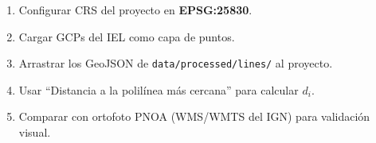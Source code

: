 \begin{enumerate}[leftmargin=1.5em]
  \item Configurar CRS del proyecto en \textbf{EPSG:25830}.
  \item Cargar GCPs del IEL como capa de puntos.
  \item Arrastrar los GeoJSON de \texttt{data/processed/lines/} al proyecto.
  \item Usar ``Distancia a la polilínea más cercana'' para calcular $d_i$.
  \item Comparar con ortofoto PNOA (WMS/WMTS del IGN) para validación visual.
\end{enumerate}

